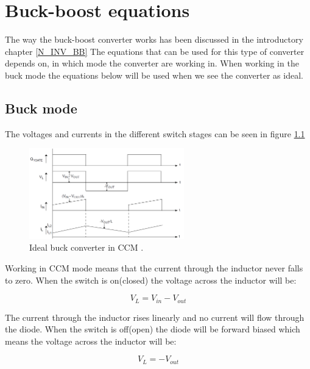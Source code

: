 \chapter{Buck-boost equations}\label{ch:Appbuckboost}

The way the buck-boost converter works has been discussed in the introductory chapter \ref{N_INV_BB} The equations that can be used for this type of converter depends on, in which mode the converter are working in. When working in the buck mode the equations below will be used when we see the converter as ideal. 

\section{Buck mode}

The voltages and currents in the different switch stages can be seen in figure \ref{CCM_buck}

\begin{figure}[htbp]
	\begin{center}
		\includegraphics[width=0.6\textwidth]{../Pictures/P1/Appendix/buck_currents}
		\caption{Ideal buck converter in CCM \cite{AN1114_MC}.}
		\label{CCM_buck}
	\end{center}	
\end{figure}

Working in CCM mode means that the current through the inductor never falls to zero. When the switch is on(closed) the voltage across the inductor will be: 

\begin{equation}
V_L = V_{in}-V_{out}
\end{equation} 

The current through the inductor rises linearly and no current will flow through the diode.
When the switch is off(open) the diode will be forward biased which means the voltage across the inductor will be:

\begin{equation}
V_L = -V_{out}
\end{equation} 

